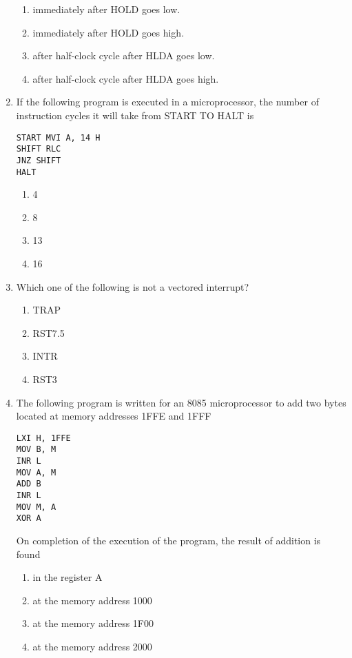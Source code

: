 \documentclass[journal,12pt,twocolumn]{IEEEtran}
\begin{document}
\begin{enumerate}
    \begin{enumerate}
      \item immediately after HOLD goes low. 
      \item immediately after HOLD goes high.
      \item after half-clock cycle after HLDA goes low.
      \item after half-clock cycle after HLDA goes high.
    \end{enumerate}
    \item  If the following program is executed in a microprocessor, the number of
instruction cycles it will take from START TO HALT is\\
\begin{verbatim}
START MVI A, 14 H 
SHIFT RLC        
JNZ SHIFT        
HALT
\end{verbatim}
     \begin{enumerate}
      \item 4 
      \item 8
      \item 13
      \item 16
    \end{enumerate}
    \item Which one of the following is not a vectored interrupt?\\
     \begin{enumerate}
      \item TRAP 
      \item RST7.5
      \item INTR 
      \item RST3
    \end{enumerate}
    \item The following program is written for an 8085 microprocessor to add two bytes
located at memory addresses 1FFE and 1FFF\\
\begin{verbatim}
LXI H, 1FFE
MOV B, M
INR L
MOV A, M
ADD B
INR L
MOV M, A
XOR A
\end{verbatim}
On completion of the execution of the program, the result of addition is found\\ 
     \begin{enumerate}
      \item in the register A
      \item at the memory address 1000
      \item at the memory address 1F00
      \item at the memory address 2000

\end{enumerate}
\end{enumerate}
\end{document}

